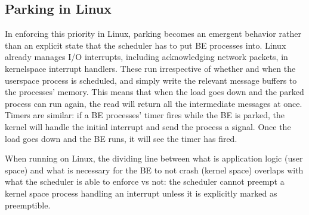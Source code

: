 \subsection{Parking in Linux}

In enforcing this priority in Linux, parking becomes an emergent behavior rather
than an explicit state that the scheduler has to put BE processes into. Linux
already manages I/O interrupts, including acknowledging network packets, in
kernelspace interrupt handlers. These run irrespective of whether and when the
userspace process is scheduled, and simply write the relevant message buffers to
the processes' memory. This means that when the load goes down and the parked
process can run again, the read will return all the intermediate messages at
once. Timers are similar: if a BE processes' timer fires while the BE is parked,
the kernel will handle the initial interrupt and send the process a signal. Once
the load goes down and the BE runs, it will see the timer has fired.

When running on Linux, the dividing line between what is application logic (user
space) and what is necessary for the BE to not crash (kernel space) overlaps
with what the scheduler is able to enforce vs not: the scheduler cannot preempt
a kernel space process handling an interrupt unless it is explicitly marked as
preemptible.